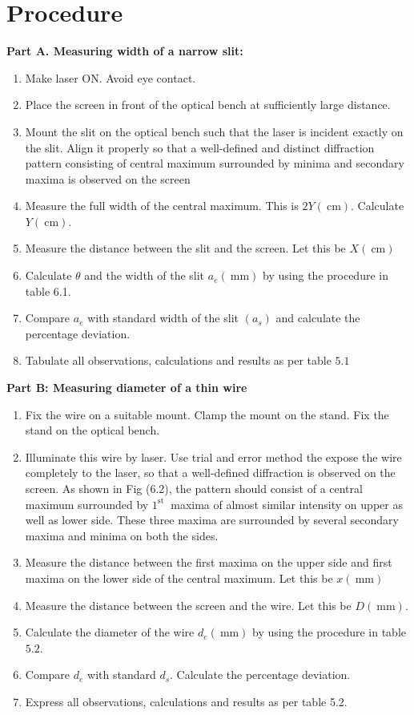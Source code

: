 \documentclass[11pt]{article}
\begin{document}
\clearpage
\section{Procedure}
	
\textbf{Part A. Measuring width of a narrow slit:}\\

\begin{enumerate}
	\item Make laser ON. Avoid eye contact.
	\item  Place the screen in front of the optical bench at sufficiently large distance.
	\item Mount the slit on the optical bench such that the laser is incident exactly on the slit. Align it properly so that a well-defined and distinct diffraction pattern consisting of central maximum surrounded by minima and secondary maxima is observed on the screen
	\item Measure the full width of the central maximum. This is $2 Y(\mathrm{~cm})$. Calculate $Y(\mathrm{~cm})$.
	\item Measure the distance between the slit and the screen. Let this be $X(\mathrm{~cm})$
	\item Calculate $\theta$ and the width of the slit $a_{e}(\mathrm{~mm})$ by using the procedure in table 6.1.
	\item Compare $a_{e}$ with standard width of the slit $\left(a_{s}\right)$ and calculate the percentage deviation.
	\item Tabulate all observations, calculations and results as per table $5.1$
\end{enumerate}
\noindent
\textbf{Part B: Measuring diameter of a thin wire}\\
\begin{enumerate}
	\item Fix the wire on a suitable mount. Clamp the mount on the stand. Fix the stand on the optical bench.
	\item Illuminate this wire by laser. Use trial and error method the expose the wire completely to the laser, so that a well-defined diffraction is observed on the screen. As shown in Fig (6.2), the pattern should consist of a central maximum surrounded by $1^{\text {st }}$ maxima of almost similar intensity on upper as well as lower side. These three maxima are surrounded by several secondary maxima and minima on both the sides.
	\item Measure the distance between the first maxima on the upper side and first maxima on the lower side of the central maximum. Let this be $x(\mathrm{~mm})$
	\item Measure the distance between the screen and the wire. Let this be $D(\mathrm{~mm})$.
	\item Calculate the diameter of the wire $d_{e}(\mathrm{~mm})$ by using the procedure in table $5.2$.
	\item Compare $d_{e}$ with standard $d_{s}$. Calculate the percentage deviation.
	\item Express all observations, calculations and results as per table 5.2.
\end{enumerate}
\end{document}
